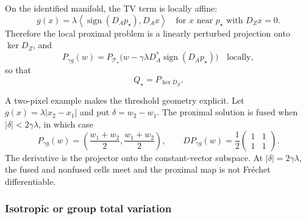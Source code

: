\documentclass[10pt,leqno]{amsart}
\numberwithin{equation}{section}
\numberwithin{algorithm}{section}
\theoremstyle{remark}
\newcommand{\ip}[2]{\left\langle #1,#2 \right\rangle}
\begin{document}
On the identified manifold, the TV term is locally affine:
\begin{equation}
\label{eq:dm-aniso-tv-local-affine}
   g(x)
     =\lambda\ip{\operatorname{sign}(D_Ap_\star)}{D_Ax}
     \quad\text{for }x\text{ near }p_\star
     \text{ with }D_Zx=0.
\end{equation}
Therefore the local proximal problem is a linearly perturbed projection onto \(\ker D_Z\), and
\begin{equation}
\label{eq:dm-aniso-tv-local-prox}
   P_{\gamma g}(w)
      =P_{\mathcal T_\star}
        \bigl(w-\gamma\lambda D_A^*\operatorname{sign}(D_Ap_\star)\bigr)
      \quad\text{locally},
\end{equation}
so that
\begin{equation}
\label{eq:dm-aniso-tv-Q}
   Q_\star=P_{\ker D_Z}.
\end{equation}

A two-pixel example makes the threshold geometry explicit.  Let
\(
 g(x)=\lambda|x_2-x_1|
\)
and put \(\delta=w_2-w_1\).  The proximal solution is fused when
\(
 |\delta|<2\gamma\lambda
\), in which case
\[
   P_{\gamma g}(w)
      =\left(\frac{w_1+w_2}{2},
              \frac{w_1+w_2}{2}\right),
   \qquad
   DP_{\gamma g}(w)
      =\frac12
       \begin{pmatrix}1&1\\[1mm]1&1\end{pmatrix}.
\]
The derivative is the projector onto the constant-vector subspace.  At
\(
 |\delta|=2\gamma\lambda
\), the fused and nonfused cells meet and the proximal map is not Fr\'echet differentiable.

\subsubsection{Isotropic or group total variation}
\end{document}

